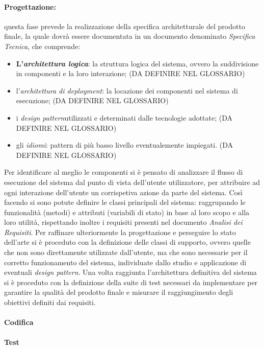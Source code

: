 \paragraph{Progettazione:} questa fase prevede la realizzazione della specifica architetturale del prodotto finale, la quale dovrà essere documentata in un documento denominato \textit{Specifica Tecnica}, che comprende:
\begin{itemize}
    \item \textbf{L'\textit{architettura logica}}\glo: la struttura logica del sistema, ovvero la suddivisione in componenti e la loro interazione; (DA DEFINIRE NEL GLOSSARIO)
    \item l'\textit{architettura di deployment}\glo: la locazione dei componenti nel sistema di esecuzione; (DA DEFINIRE NEL GLOSSARIO)
    \item i \textit{design pattern}\glo utilizzati e determinati dalle tecnologie adottate; (DA DEFINIRE NEL GLOSSARIO)
    \item gli \textit{idiomi}\glo: pattern di più basso livello eventualemente impiegati. (DA DEFINIRE NEL GLOSSARIO)
\end{itemize}
Per identificare al meglio le componenti si è pensato di analizzare il flusso di esecuzione del sistema dal punto di vista dell'utente utilizzatore, per attribuire ad ogni interazione dell'utente un corrispetiva azione da parte del sistema. \newline
Così facendo si sono potute definire le classi principali del sistema: raggrupando le funzionalità (metodi) e attributi (variabili di stato) in base al loro scopo e alla loro utilità, rispettando inoltre i requisiti presenti nel documento \textit{Analisi dei Requisiti}. \newline
Per raffinare ulteriormente la progettazione e perseguire lo stato dell'arte si è proceduto con la definizione delle classi di supporto, ovvero quelle che non sono direttamente utilizzate dall'utente, ma che sono necessarie per il corretto funzionamento del sistema, individuate dallo studio e applicazione di eventuali \textit{design pattern}. \newline
Una volta raggiunta l'architettura definitiva del sistema si è proceduto con la definizione della suite di test necessari da implementare per garantire la qualità del prodotto finale e misurare il raggiungimento degli obiettivi definiti dai requisiti. 

\paragraph{Codifica}

\paragraph{Test}


